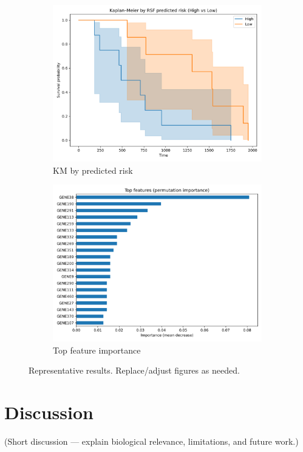 \documentclass[11pt]{article}
\begin{document}
\begin{figure}[ht]
  \centering
  \begin{subfigure}{0.48\textwidth}
    \includegraphics[width=\linewidth]{figures/km_plot.png}
    \caption{KM by predicted risk}
  \end{subfigure}\quad
  \begin{subfigure}{0.48\textwidth}
    \includegraphics[width=\linewidth]{figures/feature_importance.png}
    \caption{Top feature importance}
  \end{subfigure}
  \caption{Representative results. Replace/adjust figures as needed.}
\end{figure}

\section{Discussion}
(Short discussion — explain biological relevance, limitations, and future work.)
\end{document}
